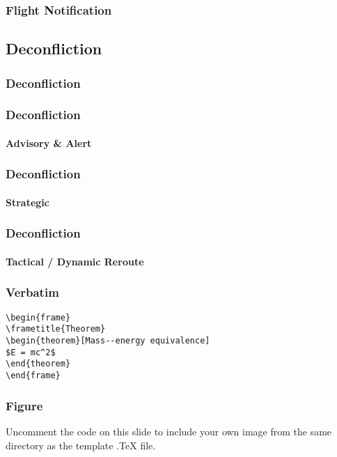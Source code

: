 \documentclass[usenames,dvipsnames,aspectratio=169,serif]{beamer}
\begin{document}
\begin{frame}
	\frametitle{Flight Notification}
\end{frame}


\subsection{Deconfliction}

\begin{frame}
	\frametitle{Deconfliction}
\end{frame}

\begin{frame}
	\frametitle{Deconfliction}
	\framesubtitle{Advisory \& Alert}
\end{frame}

\begin{frame}
	\frametitle{Deconfliction}
	\framesubtitle{Strategic}
\end{frame}

\begin{frame}
	\frametitle{Deconfliction}
	\framesubtitle{Tactical / Dynamic Reroute}
\end{frame}

\begin{frame}[fragile] %
\frametitle{Verbatim}
\begin{example}
\begin{verbatim}
\begin{frame}
\frametitle{Theorem}
\begin{theorem}[Mass--energy equivalence]
$E = mc^2$
\end{theorem}
\end{frame}\end{verbatim}
\end{example}
\end{frame}



\begin{frame}
\frametitle{Figure}
Uncomment the code on this slide to include your own image from the same directory as the template .TeX file.
\end{frame}

\end{document}
